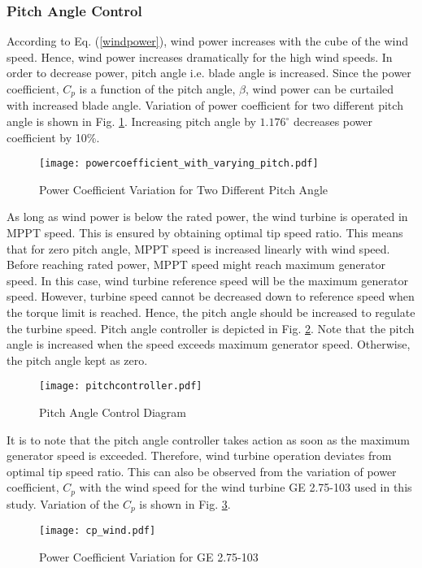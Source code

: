 \subsubsection{Pitch Angle Control}
According to Eq. (\ref{windpower}), wind power increases with the cube of the wind speed. Hence, wind power increases dramatically for the high wind speeds. In order to decrease power, pitch angle i.e. blade angle is increased. Since the power coefficient, $C_{p}$ is a function of the pitch angle, $\beta$, wind power can be curtailed with increased blade angle. Variation of power coefficient for two different pitch angle is shown in Fig. \ref{cpwithtwopitchangle}. Increasing pitch angle by $1.176^{\circ}$ decreases power coefficient by 10\%.\par
\begin{figure}[h!]
	\centering
	\texttt{[image: powercoefficient\_with\_varying\_pitch.pdf]}
	\caption{Power Coefficient Variation for Two Different Pitch Angle}
	\label{cpwithtwopitchangle}
\end{figure} 
As long as wind power is below the rated power, the wind turbine is operated in MPPT speed. This is ensured by obtaining optimal tip speed ratio. This means that for zero pitch angle, MPPT speed is increased linearly with wind speed. Before reaching rated power, MPPT speed might reach maximum generator speed. In this case, wind turbine reference speed will be the maximum generator speed. However, turbine speed cannot be decreased down to reference speed when the torque limit is reached. Hence, the pitch angle should be increased to regulate the turbine speed. Pitch angle controller is depicted in Fig. \ref{pitchcontroller}. Note that the pitch angle is increased when the speed exceeds maximum generator speed. Otherwise, the pitch angle kept as zero. \par
\begin{figure}[h!]
	\centering
	\texttt{[image: pitchcontroller.pdf]}
	\caption{Pitch Angle Control Diagram}
	\label{pitchcontroller}
\end{figure}
It is to note that the pitch angle controller takes action as soon as the maximum generator speed is exceeded. Therefore, wind turbine operation deviates from optimal tip speed ratio. This can also be observed from the variation of power coefficient, $C_{p}$ with the wind speed for the wind turbine GE 2.75-103 used in this study. Variation of the $C_{p}$ is shown in Fig. \ref{powercoefficientge}.
\begin{figure}[h!]
	\centering
	\texttt{[image: cp\_wind.pdf]}
	\caption{Power Coefficient Variation for GE 2.75-103}
	\label{powercoefficientge}
\end{figure}
